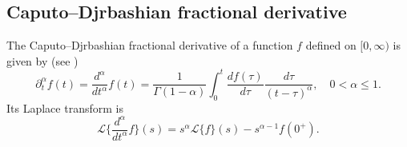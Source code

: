 \documentclass[11pt,oneside,reqno]{amsart}
\theoremstyle{definition}
\theoremstyle{remarkstyle}
\begin{document}
\subsection{Caputo–Djrbashian fractional derivative}\label{caputo}
The Caputo–Djrbashian fractional derivative of a function $f$ defined on $[0,\infty)$ is given by (see \citet{Leonenko2017})
\begin{equation*}
    \partial_{t}^{\alpha}f(t)=\frac{d^\alpha}{dt^\alpha}f(t)=\frac{1}{\Gamma(1-\alpha)}\int_{0}^{t}\frac{df(\tau)}{d\tau}\frac{d\tau}{(t-\tau)^{\alpha}}, \quad 0<\alpha\le 1.
\end{equation*}
Its Laplace transform is 
\begin{equation*}
    \mathcal{L}\{\frac{d^\alpha}{dt^\alpha}f\}(s)=s^\alpha \mathcal{L}\{f\}(s)-s^{\alpha-1}f(0^+).
\end{equation*}


\end{document}
